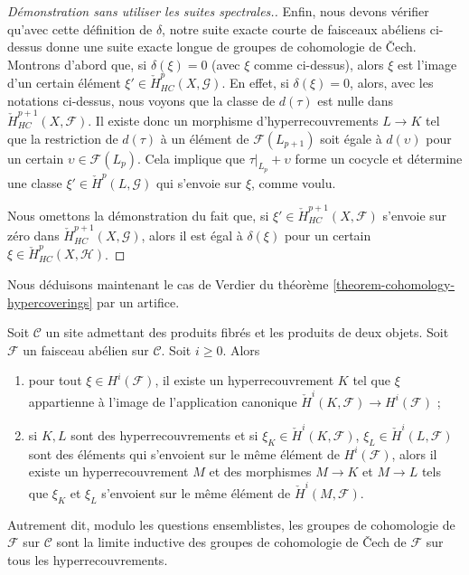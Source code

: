 \begin{proof}[Démonstration sans utiliser les suites spectrales.]
\medskip\noindent
Enfin, nous devons vérifier qu'avec cette définition de $\delta$,
notre suite exacte courte de faisceaux abéliens ci-dessus donne une
suite exacte longue de groupes de cohomologie de {\v C}ech.
Montrons d'abord que, si $\delta(\xi) = 0$ (avec $\xi$ comme ci-dessus), alors
$\xi$ est l'image d'un certain élément
$\xi' \in \check{H}^p_{HC}(X, \mathcal{G})$.
En effet, si $\delta(\xi) = 0$, alors, avec les notations ci-dessus, nous
voyons que la classe de $d(\tau)$ est nulle dans
$\check{H}^{p + 1}_{HC}(X, \mathcal{F})$. Il existe donc
un morphisme d'hyperrecouvrements $L \to K$ tel que la restriction
de $d(\tau)$ à un élément de $\mathcal{F}(L_{p + 1})$ soit
égale à $d(\upsilon)$ pour un certain $\upsilon \in \mathcal{F}(L_p)$.
Cela implique que $\tau|_{L_p} + \upsilon$ forme un
cocycle et détermine une classe $\xi' \in \check{H}^p(L, \mathcal{G})$
qui s'envoie sur $\xi$, comme voulu.

\medskip\noindent
Nous omettons la démonstration du fait que, si $\xi' \in \check{H}^{p + 1}_{HC}(X, \mathcal{F})$
s'envoie sur zéro dans $\check{H}^{p + 1}_{HC}(X, \mathcal{G})$, alors il est
égal à $\delta(\xi)$ pour un certain $\xi \in \check{H}^p_{HC}(X, \mathcal{H})$.
\end{proof}

\noindent
Nous déduisons maintenant le cas de Verdier du
théorème \ref{theorem-cohomology-hypercoverings}
par un artifice.

\begin{proposition}
\label{proposition-cohomology-hypercoverings}
Soit $\mathcal{C}$ un site admettant des produits fibrés et les produits de deux objets.
Soit $\mathcal{F}$ un faisceau abélien sur $\mathcal{C}$.
Soit $i \geq 0$. Alors
\begin{enumerate}
\item pour tout $\xi \in H^i(\mathcal{F})$, il existe un hyperrecouvrement
$K$ tel que $\xi$ appartienne à l'image de l'application canonique
$\check{H}^i(K, \mathcal{F}) \to H^i(\mathcal{F})$ ;
\item si $K, L$ sont des hyperrecouvrements et si $\xi_K \in \check{H}^i(K, \mathcal{F})$,
$\xi_L \in \check{H}^i(L, \mathcal{F})$ sont des éléments qui s'envoient
sur le même élément de $H^i(\mathcal{F})$, alors il existe
un hyperrecouvrement $M$ et des morphismes $M \to K$ et $M \to L$ tels
que $\xi_K$ et $\xi_L$ s'envoient sur le même élément de
$\check{H}^i(M, \mathcal{F})$.
\end{enumerate}
Autrement dit, modulo les questions ensemblistes, les groupes de
cohomologie de $\mathcal{F}$ sur $\mathcal{C}$ sont la limite inductive des
groupes de cohomologie de {\v C}ech de $\mathcal{F}$ sur tous les hyperrecouvrements.
\end{proposition}

